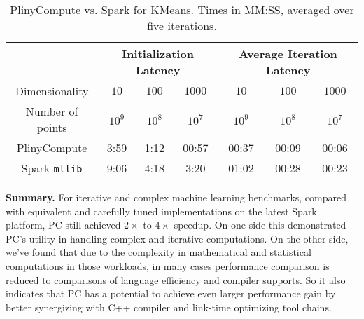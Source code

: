 \begin{table}[h!]
\begin{center}
\begin{tabular}{|c||c|c|c||c|c|c||}
\hline
& \multicolumn{3}{c||}{Initialization Latency} & \multicolumn{3}{c||}{Average
                                         Iteration Latency} \\
\hline
Dimensionality & $10$ & $100$ & $1000$ & $10$ & $100$ & $1000$\\
Number of points & $10^9$ & $10^8$ & $10^7$ & $10^9$ & $10^8$ & $10^7$\\
\hline
PlinyCompute &3:59 & 1:12 & 00:57 &00:37 & 00:09 & 00:06\\
Spark \texttt{mllib} &9:06  &4:18 &3:20 &01:02 & 00:28 & 00:23\\
\hline
\end{tabular}
\caption{PlinyCompute vs. Spark for KMeans. Times in MM:SS, averaged over five iterations.}
\label{fig:KMeans}
\end{center}
\end{table}


\vspace{5pt}
\noindent
\textbf{Summary.} For iterative and complex machine learning
benchmarks, compared with equivalent and carefully tuned implementations on the latest
Spark platform, PC still achieved $2 \times$ to $4 \times$
speedup. On one side this demonstrated PC's utility in handling
complex and iterative computations. On the other side, we've found that due to the complexity in mathematical and statistical
computations in those workloads, in many cases performance comparison is reduced to comparisons of
language efficiency and compiler supports. So it also indicates that PC has a
potential to achieve even larger performance gain by better
synergizing with C++ compiler and link-time optimizing tool chains.







